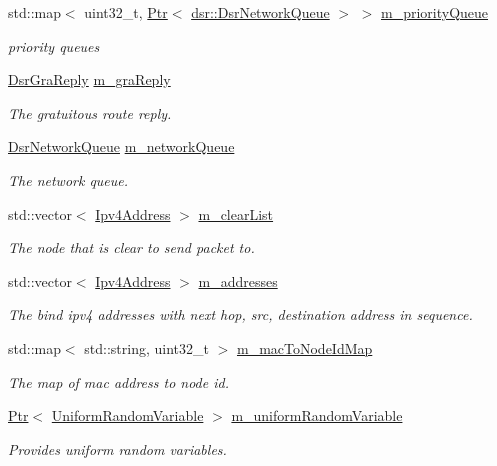 \begin{DoxyCompactItemize}
std\+::map$<$ uint32\+\_\+t, \hyperlink{classns3_1_1Ptr}{Ptr}$<$ \hyperlink{classns3_1_1dsr_1_1DsrNetworkQueue}{dsr\+::\+Dsr\+Network\+Queue} $>$ $>$ \hyperlink{classns3_1_1dsr_1_1DsrRouting_a4606c3dfb1099afbfe1e7cd1d1c3c8ee}{m\+\_\+priority\+Queue}
\begin{DoxyCompactList}\small\item\em priority queues \end{DoxyCompactList}\item 
\hyperlink{classns3_1_1dsr_1_1DsrGraReply}{Dsr\+Gra\+Reply} \hyperlink{classns3_1_1dsr_1_1DsrRouting_a9208badf7697dda01917aa2034b0b59c}{m\+\_\+gra\+Reply}
\begin{DoxyCompactList}\small\item\em The gratuitous route reply. \end{DoxyCompactList}\item 
\hyperlink{classns3_1_1dsr_1_1DsrNetworkQueue}{Dsr\+Network\+Queue} \hyperlink{classns3_1_1dsr_1_1DsrRouting_a4a59e341508820cdc2e46bcc7f7db59c}{m\+\_\+network\+Queue}
\begin{DoxyCompactList}\small\item\em The network queue. \end{DoxyCompactList}\item 
std\+::vector$<$ \hyperlink{classns3_1_1Ipv4Address}{Ipv4\+Address} $>$ \hyperlink{classns3_1_1dsr_1_1DsrRouting_add76dd26d3fd2721ab9be4520daa477f}{m\+\_\+clear\+List}
\begin{DoxyCompactList}\small\item\em The node that is clear to send packet to. \end{DoxyCompactList}\item 
std\+::vector$<$ \hyperlink{classns3_1_1Ipv4Address}{Ipv4\+Address} $>$ \hyperlink{classns3_1_1dsr_1_1DsrRouting_a350fab49fe12651b852fa42363684990}{m\+\_\+addresses}
\begin{DoxyCompactList}\small\item\em The bind ipv4 addresses with next hop, src, destination address in sequence. \end{DoxyCompactList}\item 
std\+::map$<$ std\+::string, uint32\+\_\+t $>$ \hyperlink{classns3_1_1dsr_1_1DsrRouting_aadd597196a7816f0eca78f213a3aae44}{m\+\_\+mac\+To\+Node\+Id\+Map}
\begin{DoxyCompactList}\small\item\em The map of mac address to node id. \end{DoxyCompactList}\item 
\hyperlink{classns3_1_1Ptr}{Ptr}$<$ \hyperlink{classns3_1_1UniformRandomVariable}{Uniform\+Random\+Variable} $>$ \hyperlink{classns3_1_1dsr_1_1DsrRouting_a22a85b3510166ffdd451e4010f996f0f}{m\+\_\+uniform\+Random\+Variable}
\begin{DoxyCompactList}\small\item\em Provides uniform random variables. \end{DoxyCompactList}\end{DoxyCompactItemize}
